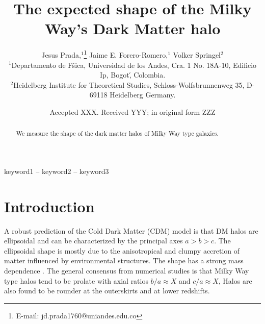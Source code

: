 \documentclass[a4paper,fleqn,usenatbib]{mnras}
\title[Title]{The expected shape of the Milky Way's Dark Matter halo}
\author[Jesus Prada,  Jaime E. Forero-Romero, Volker Springel ]{
Jesus Prada,$^{1}$\thanks{E-mail: jd.prada1760@uniandes.edu.co}
Jaime E. Forero-Romero,$^{1}$
Volker Springel$^{2}$
\\
$^{1}$Departamento de F\'sica, Universidad de los Andes, Cra. 1 No.
18A-10, Edificio Ip, Bogot\', Colombia.\\
$^{2}$Heidelberg Institute for Theoretical Studies, Schloss-Wolfsbrunnenweg 35, D-69118 Heidelberg
Germany.\\
}
\date{Accepted XXX. Received YYY; in original form ZZZ}
\begin{document}
\label{firstpage}
\pagerange{\pageref{firstpage}--\pageref{lastpage}}
\maketitle

\begin{abstract}
We measure the shape of the dark matter halos of Milky Way type galaxies.
\end{abstract}

\begin{keywords}
keyword1 -- keyword2 -- keyword3
\end{keywords}



\section{Introduction}


A robust prediction of the Cold Dark Matter (CDM) model is that DM
halos are ellipsoidal and can be characterized by the principal axes
$a>b>c$.
The ellipsoidal shape is mostly due to the anisotropical and
clumpy accretion of matter influenced by environmental structures. 
The shape has a strong mass dependence \citep{Allgood_et_al._2006}. 
The general consensus from numerical studies is that Milky Way type
halos tend to be prolate with axial ratios $b/a\approx X$ and  $c/a\approx X$, 
Halos are also found to be rounder at the outerskirts and at lower
redshifts.  




\end{document}

